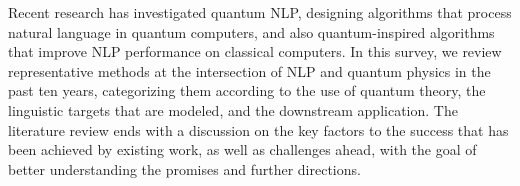 Recent research has investigated quantum NLP, designing algorithms that process natural language in quantum computers, and also quantum-inspired algorithms that improve NLP performance on classical computers. In this survey, we review representative methods at the intersection of NLP and quantum physics in the past ten years, categorizing them according to the use of quantum theory, the linguistic targets that are modeled, and the downstream application. The literature review ends with a discussion on the key factors to the success that has been achieved by existing work, as well as challenges ahead, with the goal of better understanding the promises and further directions.
